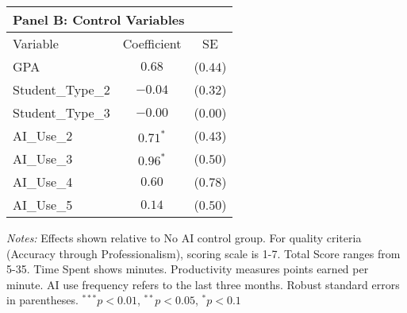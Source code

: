 \begin{table}[!htbp]
\vspace{0.3cm}

\begin{tabular}{lcc}
\multicolumn{3}{l}{\textbf{Panel B: Control Variables}} \\
\hline\hline
Variable & Coefficient & SE \\
\hline
GPA & $0.68$ & ($0.44$) \\
Student_Type_2 & $-0.04$ & ($0.32$) \\
Student_Type_3 & $-0.00$ & ($0.00$) \\
AI_Use_2 & $0.71^{*}$ & ($0.43$) \\
AI_Use_3 & $0.96^{*}$ & ($0.50$) \\
AI_Use_4 & $0.60$ & ($0.78$) \\
AI_Use_5 & $0.14$ & ($0.50$) \\
\hline
\end{tabular}
\begin{tablenotes}
\small
\item \textit{Notes:} Effects shown relative to No AI control group. For quality criteria (Accuracy through Professionalism), scoring scale is 1-7. Total Score ranges from 5-35. Time Spent shows minutes. Productivity measures points earned per minute. AI use frequency refers to the last three months. Robust standard errors in parentheses. $^{***}p<0.01$, $^{**}p<0.05$, $^{*}p<0.1$
\end{tablenotes}
\end{table}